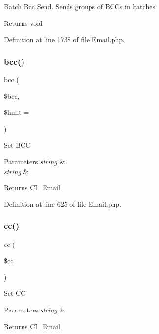 Batch Bcc Send. Sends groups of B\+C\+Cs in batches

\begin{DoxyReturn}{Returns}
void 
\end{DoxyReturn}


Definition at line 1738 of file Email.\+php.

\mbox{\label{class_c_i___email_ae7da2abc30865dd8ba3fcb3366889d7a}} 
\subsubsection{\texorpdfstring{bcc()}{bcc()}}
{\footnotesize\ttfamily bcc (\begin{DoxyParamCaption}\item[{}]{\$bcc,  }\item[{}]{\$limit = {\ttfamily \textquotesingle{}\textquotesingle{}} }\end{DoxyParamCaption})}

Set B\+CC


\begin{DoxyParams}{Parameters}
{\em string} & \\
\hline
{\em string} & \\
\hline
\end{DoxyParams}
\begin{DoxyReturn}{Returns}
\mbox{\hyperlink{class_c_i___email}{C\+I\+\_\+\+Email}} 
\end{DoxyReturn}


Definition at line 625 of file Email.\+php.

\mbox{\label{class_c_i___email_a785e883837f95eeffed21226563fc7e5}} 
\subsubsection{\texorpdfstring{cc()}{cc()}}
{\footnotesize\ttfamily cc (\begin{DoxyParamCaption}\item[{}]{\$cc }\end{DoxyParamCaption})}

Set CC


\begin{DoxyParams}{Parameters}
{\em string} & \\
\hline
\end{DoxyParams}
\begin{DoxyReturn}{Returns}
\mbox{\hyperlink{class_c_i___email}{C\+I\+\_\+\+Email}} 
\end{DoxyReturn}


